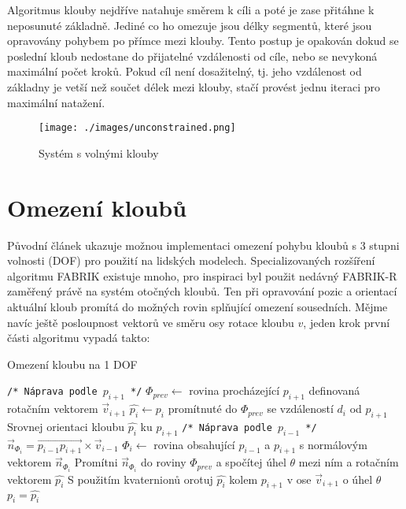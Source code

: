 \documentclass[czech]{pyt-report}
\begin{document}
\noindent Algoritmus klouby nejdříve natahuje směrem k cíli a poté je zase přitáhne k neposunuté základně. Jediné co ho omezuje jsou délky segmentů, které jsou opravovány pohybem po přímce mezi klouby. Tento postup je opakován dokud se poslední kloub nedostane do přijatelné vzdálenosti od cíle, nebo se nevykoná maximální počet kroků. Pokud cíl není dosažitelný, tj. jeho vzdálenost od základny je vetší než součet délek mezi klouby, stačí provést jednu iteraci pro maximální natažení.

\begin{figure}[h]
  \centering\leavevmode
  \texttt{[image: ./images/unconstrained.png]}\vskip-0.5cm
  \medskip
  \caption{Systém s volnými klouby}
  \label{fig:non-constrained-system}
\end{figure}

\section{Omezení kloubů}
\label{sec:omezeni}
Původní článek ukazuje možnou implementaci omezení pohybu kloubů s 3 stupni volnosti (DOF) pro použití na lidských modelech. Specializovaných rozšíření algoritmu FABRIK existuje mnoho, pro inspiraci byl použit nedávný FABRIK-R\cite{bib:fabrik-r} zaměřený právě na systém otočných kloubů. Ten při opravování pozic a orientací aktuální kloub promítá do možných rovin splňující omezení sousedních. Mějme navíc ještě posloupnost vektorů ve směru osy rotace kloubu $v$, jeden krok první části algoritmu vypadá takto:

\begin{algorithm}[H]
\caption{Omezení kloubu na 1 DOF}\label{alg:1dof}
\begin{algorithmic}[1]
\Statex \texttt{/* Náprava podle $p_{i+1}$ */}
\State $\Phi_{prev} \gets$ rovina procházející $p_{i+1}$ definovaná rotačním vektorem $\vec{v}_{i+1}$
\State $\hat{p_i} \gets p_i$ promítnuté do $\Phi_{prev}$ se vzdáleností $d_i$ od $p_{i+1}$
\State Srovnej orientaci kloubu $\hat{p_i}$ ku $p_{i+1}$
\Statex
\Statex \texttt{/* Náprava podle $p_{i-1}$ */}
\State $\vec{n}_{\Phi_i} = \overrightarrow{p_{i-1}p_{i+1}} \times \vec{v}_{i-1}$
\State $\Phi_{i} \gets$ rovina obsahující $p_{i-1}$ a $p_{i+1}$ s normálovým vektorem $\vec{n}_{\Phi_i}$ 
\State Promítni $\vec{n}_{\Phi_i}$ do roviny $\Phi_{prev}$ a spočítej úhel $\theta$ mezi ním a rotačním vektorem $\hat{p_i}$
\State S použitím kvaternionů orotuj $\hat{p_i}$ kolem $p_{i+1}$ v ose $\vec{v}_{i+1}$ o úhel $\theta$
\State $p_i = \hat{p_i}$
\end{algorithmic}
\end{algorithm}
\end{document}
